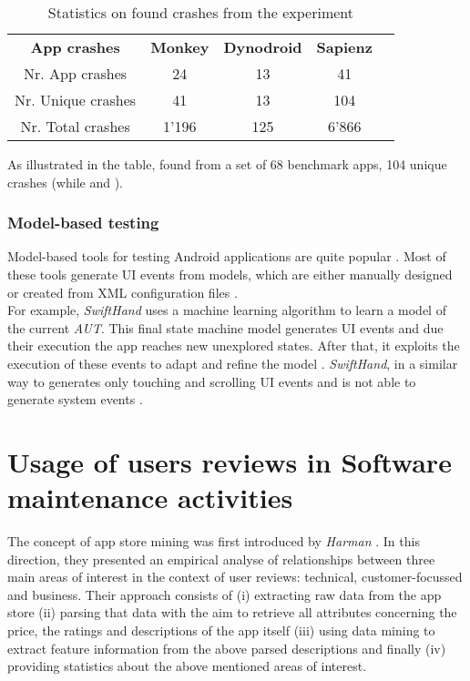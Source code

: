 \begin{table}[tb]
\centering
\caption{Statistics on found crashes from the \sapienz experiment}
\label{tbl: sapienzresults}
\begin{tabular}{|c|c|c|c|l}
\cline{1-4}
\textbf{App crashes} & \textbf{Monkey} & \textbf{Dynodroid} & \textbf{Sapienz} &  \\ \cline{1-4}
Nr. App crashes      & 24              & 13                 & 41               &  \\ \cline{1-4}
Nr. Unique crashes   & 41              & 13                 & 104              &  \\ \cline{1-4}
Nr. Total crashes    & 1'196           & 125                & 6'866             &  \\ \cline{1-4}
\end{tabular}
\end{table}
As illustrated in the table, \sapienz found from a set of 68 benchmark apps, 104 unique crashes (while  and ).

\subsubsection{Model-based testing}
Model-based tools for testing Android applications are quite popular \cite{sapienz}. Most of these tools \cite{mobiguitar, mining, guiripper,swift} generate UI events from models, which are either manually designed or created from XML configuration files \cite{sapienz}. \\
For example, \textit{SwiftHand} \cite{swift} uses a machine learning algorithm to learn a model of the current \textit{AUT}. This final state machine model \cite{areWeThereYet} generates UI events and due their execution the app reaches new unexplored states. After that, it exploits the execution of these events to adapt and refine the model \cite{swift}. \textit{SwiftHand}, in a similar way to \monkey generates only touching and scrolling UI events and is not able to generate system events \cite{areWeThereYet}.

\section{Usage of users reviews in Software maintenance activities}
\label{section:review_usage}
The concept of app store mining was first introduced by \textit{Harman} \etal
\cite{appstoremining}. In this direction, they presented an empirical analyse of relationships between three main areas of interest in the context of user reviews: technical, customer-focussed and business. 
Their approach consists of (i) extracting raw data from the app store (ii) parsing that data with the aim to retrieve all attributes concerning the price, the ratings and descriptions of the app itself (iii) using data mining to extract feature information from the above parsed descriptions and finally (iv) providing statistics about the above mentioned areas of interest.  

